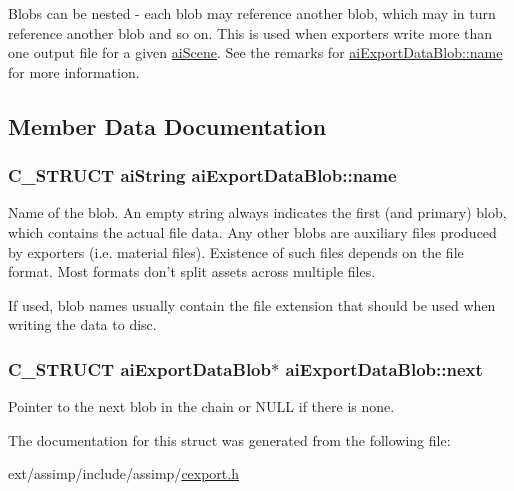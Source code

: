 Blobs can be nested -\/ each blob may reference another blob, which may in turn reference another blob and so on. This is used when exporters write more than one output file for a given \hyperlink{structai_scene}{ai\-Scene}. See the remarks for \hyperlink{structai_export_data_blob_af7f006ac5ad818c0d81d520a84f74c3e}{ai\-Export\-Data\-Blob\-::name} for more information. 

\subsection{Member Data Documentation}
\hypertarget{structai_export_data_blob_af7f006ac5ad818c0d81d520a84f74c3e}{
\subsubsection[{name}]{\setlength{\rightskip}{0pt plus 5cm}C\-\_\-\-S\-T\-R\-U\-C\-T {\bf ai\-String} ai\-Export\-Data\-Blob\-::name}}\label{structai_export_data_blob_af7f006ac5ad818c0d81d520a84f74c3e}
Name of the blob. An empty string always indicates the first (and primary) blob, which contains the actual file data. Any other blobs are auxiliary files produced by exporters (i.\-e. material files). Existence of such files depends on the file format. Most formats don't split assets across multiple files.

If used, blob names usually contain the file extension that should be used when writing the data to disc. \hypertarget{structai_export_data_blob_a3e98fa760f45983ff1bccec6715f3817}{
\subsubsection[{next}]{\setlength{\rightskip}{0pt plus 5cm}C\-\_\-\-S\-T\-R\-U\-C\-T {\bf ai\-Export\-Data\-Blob}$\ast$ ai\-Export\-Data\-Blob\-::next}}\label{structai_export_data_blob_a3e98fa760f45983ff1bccec6715f3817}
Pointer to the next blob in the chain or N\-U\-L\-L if there is none. 

The documentation for this struct was generated from the following file\-:\begin{DoxyCompactItemize}
\item 
ext/assimp/include/assimp/\hyperlink{cexport_8h}{cexport.\-h}\end{DoxyCompactItemize}
